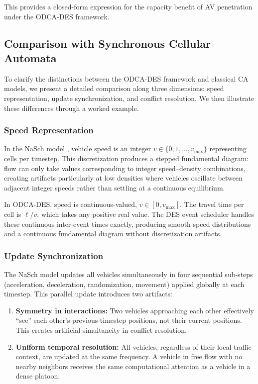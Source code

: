 \documentclass[review,authoryear]{elsarticle}
\begin{document}
This provides a closed-form expression for the capacity benefit of AV penetration under the ODCA-DES framework.


\subsection{Comparison with Synchronous Cellular Automata}
\label{sec:ca_comparison}

To clarify the distinctions between the ODCA-DES framework and classical CA models, we present a detailed comparison along three dimensions: speed representation, update synchronization, and conflict resolution. We then illustrate these differences through a worked example.

\subsubsection{Speed Representation}

In the NaSch model \citep{nagel1992cellular}, vehicle speed is an integer $v \in \{0, 1, \ldots, v_{\max}\}$ representing cells per timestep. This discretization produces a stepped fundamental diagram: flow can only take values corresponding to integer speed--density combinations, creating artifacts particularly at low densities where vehicles oscillate between adjacent integer speeds rather than settling at a continuous equilibrium.

In ODCA-DES, speed is continuous-valued, $v \in [0, v_{\max}]$. The travel time per cell is $\ell/v$, which takes any positive real value. The DES event scheduler handles these continuous inter-event times exactly, producing smooth speed distributions and a continuous fundamental diagram without discretization artifacts.

\subsubsection{Update Synchronization}

The NaSch model updates all vehicles simultaneously in four sequential sub-steps (acceleration, deceleration, randomization, movement) applied globally at each timestep. This parallel update introduces two artifacts:
\begin{enumerate}
    \item \textbf{Symmetry in interactions:} Two vehicles approaching each other effectively ``see'' each other's previous-timestep positions, not their current positions. This creates artificial simultaneity in conflict resolution.
    \item \textbf{Uniform temporal resolution:} All vehicles, regardless of their local traffic context, are updated at the same frequency. A vehicle in free flow with no nearby neighbors receives the same computational attention as a vehicle in a dense platoon.
\end{enumerate}
\end{document}
